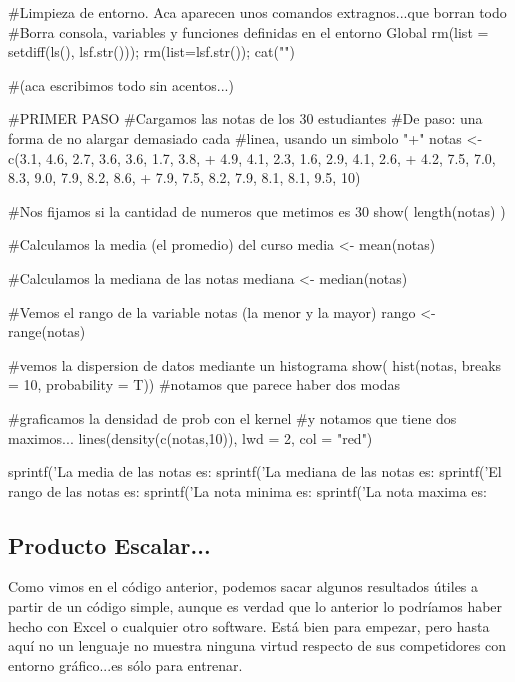 \documentclass[11pt,a4paper]{article}
\begin{document}
\begin{Schunk}
\begin{Sinput}
#Limpieza de entorno. Aca aparecen unos comandos extragnos...que borran todo
#Borra consola, variables y funciones definidas en el entorno Global
rm(list = setdiff(ls(), lsf.str()));
rm(list=lsf.str());
cat("")


#(aca escribimos todo sin acentos...)

#PRIMER PASO
#Cargamos las notas de los 30 estudiantes
#De paso: una forma de no alargar demasiado cada
#linea, usando un simbolo "+"
notas <- c(3.1, 4.6, 2.7, 3.6, 3.6, 1.7, 3.8, +
             4.9, 4.1, 2.3, 1.6, 2.9, 4.1, 2.6, + 
             4.2, 7.5, 7.0, 8.3, 9.0, 7.9, 8.2, 8.6, + 
             7.9, 7.5, 8.2, 7.9, 8.1, 8.1, 9.5, 10)


#Nos fijamos si la cantidad de numeros que metimos es 30
show( length(notas) )

#Calculamos la media (el promedio) del curso
media <-  mean(notas) 

#Calculamos la mediana de las notas
mediana <- median(notas)

#Vemos el rango de la variable notas (la menor y la mayor)
rango <-  range(notas)


#vemos la dispersion de datos mediante un histograma
show( hist(notas, breaks = 10, probability = T))
#notamos que parece haber dos modas

#graficamos la densidad de prob con el kernel
#y notamos que tiene dos maximos...
lines(density(c(notas,10)), lwd = 2, col = "red")

sprintf('La media de las notas es: %
sprintf('La mediana de las notas es: %
sprintf('El rango de las notas es: %
sprintf('La nota minima es: %
sprintf('La nota maxima es: %
\end{Sinput}
\end{Schunk}

\pagebreak


\subsection{Producto Escalar...}
Como vimos en el código anterior, podemos sacar algunos resultados útiles a partir de un código simple, aunque es verdad que lo anterior lo podríamos haber hecho con Excel o cualquier otro software. Está bien para empezar, pero hasta aquí no un lenguaje no muestra ninguna virtud respecto de sus competidores con entorno gráfico...es sólo para entrenar.
\end{document}
